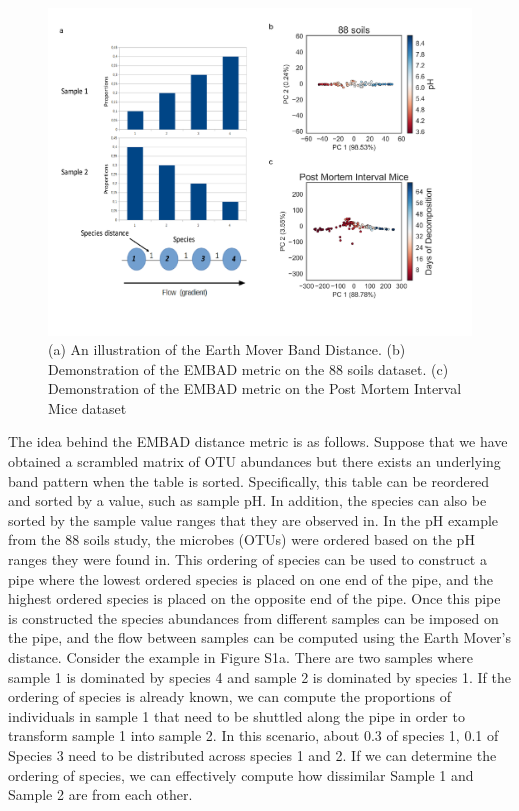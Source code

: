 \begin{figure}[H]
        \centering
        \includegraphics[width=1\textwidth]{appendix_a/FigureS1.pdf}
        \caption[An illustration of a distance metric that is engineered not to saturate.]{(a) An illustration of the Earth Mover Band Distance.  (b)  Demonstration of the EMBAD metric on the 88 soils dataset.
          (c) Demonstration of the EMBAD metric on the Post Mortem Interval Mice dataset}
        \label{figaS1}
\end{figure}
The idea behind the EMBAD distance metric is as follows.  Suppose that we have obtained a scrambled matrix of OTU abundances but there exists an underlying band pattern when the table is sorted.  Specifically, this table can be reordered and sorted by a value, such as sample pH.  In addition, the species can also be sorted by the sample value ranges that they are observed in.  In the pH example from the 88 soils study, the microbes (OTUs) were ordered based on the pH ranges they were found in.  This ordering of species can be used to construct a pipe where the lowest ordered species is placed on one end of the pipe, and the highest ordered species is placed on the opposite end of the pipe.  Once this pipe is constructed the species abundances from different samples can be imposed on the pipe, and the flow between samples can be computed using the Earth Mover’s distance.  Consider the example in Figure S1a.  There are two samples where sample 1 is dominated by species 4 and sample 2 is dominated by species 1.  If the ordering of species is already known, we can compute the proportions of individuals in sample 1 that need to be shuttled along the pipe in order to transform sample 1 into sample 2.  In this scenario, about 0.3 of species 1, 0.1 of Species 3 need to be distributed across species 1 and 2.  If we can determine the ordering of species, we can effectively compute how dissimilar Sample 1 and Sample 2 are from each other.\\[5 mm]
